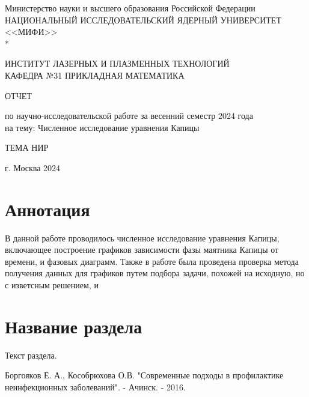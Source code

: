 \documentclass[a4paper,12pt]{article}
\begin{document}
		\renewcommand{\contentsname}{\Large Содержание}
		\renewcommand{\bibname}{\normalfont\Large\bfseries Список литературы}
		
		\begin{titlepage}
			\begin{center}
				Министерство науки и высшего образования Российской Федерации \\
				НАЦИОНАЛЬНЫЙ ИССЛЕДОВАТЕЛЬСКИЙ ЯДЕРНЫЙ УНИВЕРСИТЕТ <<МИФИ>> \\*
				\hrulefill
			\end{center}
		
		\begin{center}
			ИНСТИТУТ ЛАЗЕРНЫХ И ПЛАЗМЕННЫХ ТЕХНОЛОГИЙ\\
			КАФЕДРА №31 ПРИКЛАДНАЯ МАТЕМАТИКА
		\end{center}
		\vspace{1cm}
		
		\vspace{2em}
		
		\begin{center}
			\large{ОТЧЕТ}
			
			по научно-исследовательской работе
			за весенний семестр 2024 года \\
			
			на тему: Численное исследование уравнения Капицы
		\end{center}
		
		\begin{center}
			\large ТЕМА НИР
		\end{center}
	
	

\vspace{32em}
		
		\begin{center}
			г. Москва 2024
		\end{center}
	\end{titlepage}

	\newpage 
	\tableofcontents
	\setcounter{page}{3}
	
	\newpage
	\section*{Аннотация}
	
	В данной работе проводилось численное исследование уравнения Капицы, 
	включающее построение графиков зависимости фазы маятника Капицы от времени,
	и фазовых диаграмм. Также в работе была проведена проверка метода
	получения данных для графиков путем подбора задачи, похожей на исходную, 
	но с изветсным решением, и 
	
	\newpage
	\section{Название раздела}
	
	Текст раздела.
	
	\newpage
	
	\begin{thebibliography}{w:40}
		
		 Боргояков Е. А., Кособрюхова О.В. "Современные подходы в профилактике неинфекционных заболеваний". - Ачинск. - 2016.
		
	\end{thebibliography}
	
	
\end{document}
